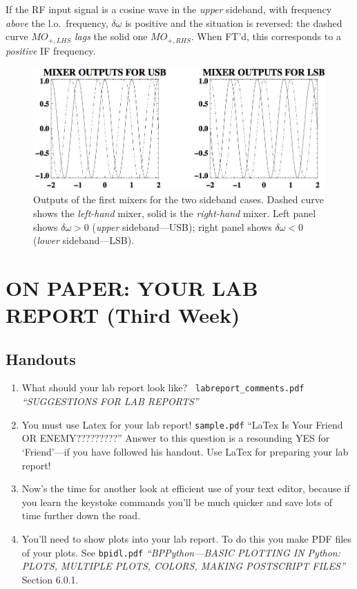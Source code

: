 \documentclass[12pt,preprint]{aastex}
\begin{document}
If the RF input signal is a cosine wave in the {\it upper} sideband, with
frequency {\it above} the l.o.\ frequency, $\delta \omega$ is positive
and the situation is
reversed: the dashed curve $MO_{+, LHS}$ {\it lags} the solid
one $MO_{+, RHS}$. When FT'd, this corresponds to a {\it positive}
IF frequency.

\begin{figure}[h]
        \includegraphics[width=6.5in]{ssbm.png}
\caption{Outputs of the first mixers for the two sideband cases. Dashed
  curve shows the {\it left-hand} mixer, solid is the {\it right-hand}
  mixer. Left panel shows $\delta \omega > 0$ ({\it upper}
  sideband---USB); right panel shows $\delta \omega < 0$ ({\it lower}
  sideband---LSB).
\label{mixerout}}
\end{figure}

\section{ON PAPER: YOUR LAB REPORT (Third Week)} \label{report}

\subsection{Handouts}

\begin{enumerate}
\item What should your lab report look like? {\tt
  labreport\_comments.pdf} {\it ``SUGGESTIONS FOR LAB REPORTS''}

\item You must use Latex for your lab report! {\tt sample.pdf} ``LaTex
  Is Your Friend OR ENEMY?????????'' Answer to this question is a
  resounding YES for `Friend'---if you have followed his handout. Use
  LaTex for preparing your lab report!

\item Now's the time for another look at efficient use of your text
  editor, because if you learn the keystoke commands you'll be much
  quicker and save lots of time further down the road.

\item You'll need to show plots into your lab report. To do this you
  make PDF files of your plots. See {\tt bpidl.pdf} {\it ``BPPython---BASIC PLOTTING IN
  Python: PLOTS, MULTIPLE PLOTS, COLORS, MAKING POSTSCRIPT FILES''} Section 6.0.1.

\end{enumerate}
\end{document}
